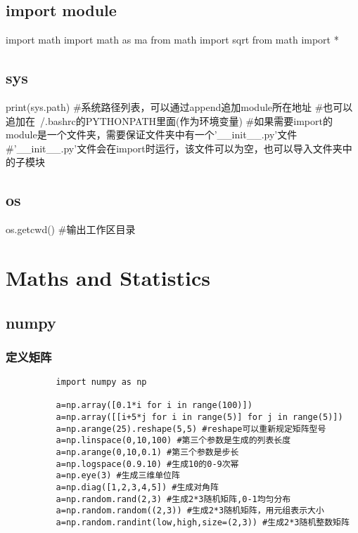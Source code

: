 \documentclass{article}
\begin{document}
    \subsection{import module}
      \begin{codeblock}[language=python, caption={import module}]
        import math
        import math as ma
        from math import sqrt
        from math import *
      \end{codeblock}

    \subsection{sys}
      \begin{codeblock}[language=python, caption={sys module}]
        print(sys.path)
        #系统路径列表，可以通过append追加module所在地址
        #也可以追加在~/.bashrc的PYTHONPATH里面(作为环境变量)
        #如果需要import的module是一个文件夹，需要保证文件夹中有一个'\_\_init\_\_.py'文件
        #'\_\_init\_\_.py'文件会在import时运行，该文件可以为空，也可以导入文件夹中的子模块
      \end{codeblock}

    \subsection{os}
      \begin{codeblock}[language=python, caption={os module}]
        os.getcwd() #输出工作区目录
      \end{codeblock}

  \section{Maths and Statistics}

    \subsection{numpy}
      \subsubsection{定义矩阵}
        \begin{lstlisting}
          import numpy as np

          a=np.array([0.1*i for i in range(100)])
          a=np.array([[i+5*j for i in range(5)] for j in range(5)])
          a=np.arange(25).reshape(5,5) #reshape可以重新规定矩阵型号
          a=np.linspace(0,10,100) #第三个参数是生成的列表长度
          a=np.arange(0,10,0.1) #第三个参数是步长
          a=np.logspace(0.9.10) #生成10的0-9次幂
          a=np.eye(3) #生成三维单位阵
          a=np.diag([1,2,3,4,5]) #生成对角阵
          a=np.random.rand(2,3) #生成2*3随机矩阵,0-1均匀分布
          a=np.random.random((2,3)) #生成2*3随机矩阵，用元组表示大小
          a=np.random.randint(low,high,size=(2,3)) #生成2*3随机整数矩阵
        \end{lstlisting}
\end{document}
